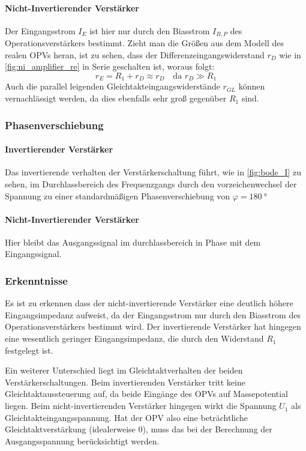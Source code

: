 \paragraph{Nicht-Invertierender Verstärker}

Der Eingangsstrom $I_E$ ist hier nur durch den Biasstrom $I_{B,P}$ des Operationsverstärkers bestimmt. Zieht man die Größen aus dem Modell des realen OPVs \cite[S.~66, Abb.~3.3]{EMTPraktikum2025} heran, ist zu sehen, dass der Differenzeingangswiderstand $r_D$ wie in \autoref{fig:ni_amplifier_re} in Serie geschalten ist, woraus folgt:
\[
r_E = R_1 + r_D \approx r_D \quad \text{da } r_D \gg R_1
\]
Auch die parallel leigenden Gleichtakteingangswiderstände $r_{GL}$ können
vernachlässigt werden, da dies ebenfalls sehr groß gegenüber $R_1$ sind.

\subsubsection{Phasenverschiebung}

\paragraph{Invertierender Verstärker} Das invertierende verhalten der Verstärkerschaltung führt, wie in \autoref{fig:bode_I} zu sehen, im Durchlassbereich des Frequenzgangs durch den vorzeichenwechsel der Spannung zu einer standardmäßigen Phasenverschiebung von $\varphi = \SI{180}{\degree}$

\paragraph{Nicht-Invertierender Verstärker} Hier bleibt das Ausgangssignal im durchlassbereich in Phase mit dem Eingangssignal.

\subsubsection{Erkenntnisse}

Es ist zu erkennen dass der nicht-invertierende Verstärker eine deutlich höhere
Eingangsimpedanz aufweist, da der Eingangsstrom nur durch den Biasstrom des
Operationsverstärkers bestimmt wird. Der invertierende Verstärker hat hingegen eine wesentlich geringer Eingangsimpedanz, die durch den Widerstand $R_1$ festgelegt ist.

Ein weiterer Unterschied liegt im Gleichtaktverhalten der beiden
Verstärkerschaltungen. Beim invertierenden Verstärker tritt keine Gleichtaktaussteuerung auf, da beide Eingänge des OPVs auf Massepotential liegen.
Beim nicht-invertierenden Verstärker hingegen wirkt die Spannung $U_1$ als Gleichtakteingangsspannung. Hat der OPV also eine beträchtliche Gleichtaktverstärkung (idealerweise $0$), muss das bei der Berechnung der Ausgangsspannung berücksichtigt werden.



